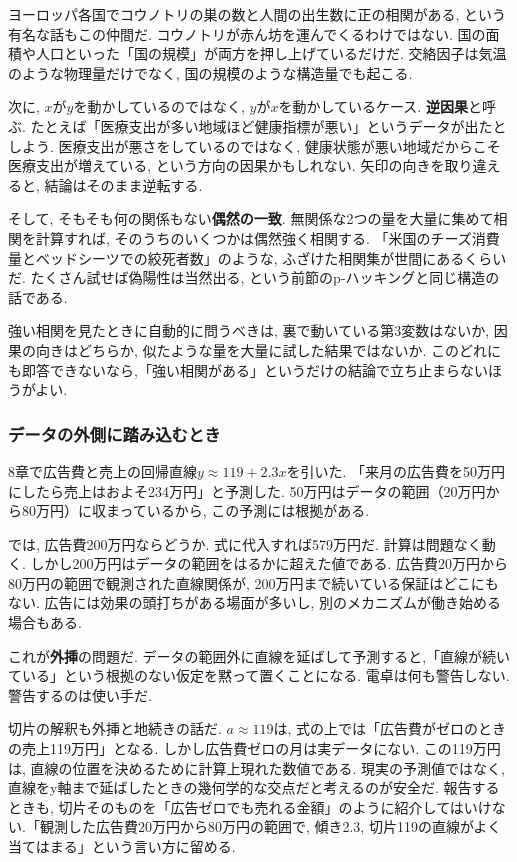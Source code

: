 ヨーロッパ各国でコウノトリの巣の数と人間の出生数に正の相関がある, という有名な話もこの仲間だ.
コウノトリが赤ん坊を運んでくるわけではない. 国の面積や人口といった「国の規模」が両方を押し上げているだけだ.
交絡因子は気温のような物理量だけでなく, 国の規模のような構造量でも起こる.

次に, $x$が$y$を動かしているのではなく, $y$が$x$を動かしているケース. \textbf{逆因果}と呼ぶ.
たとえば「医療支出が多い地域ほど健康指標が悪い」というデータが出たとしよう.
医療支出が悪さをしているのではなく, 健康状態が悪い地域だからこそ医療支出が増えている, という方向の因果かもしれない.
矢印の向きを取り違えると, 結論はそのまま逆転する.

そして, そもそも何の関係もない\textbf{偶然の一致}.
無関係な2つの量を大量に集めて相関を計算すれば, そのうちのいくつかは偶然強く相関する.
「米国のチーズ消費量とベッドシーツでの絞死者数」のような, ふざけた相関集が世間にあるくらいだ.
たくさん試せば偽陽性は当然出る, という前節のp-ハッキングと同じ構造の話である.

強い相関を見たときに自動的に問うべきは, 裏で動いている第3変数はないか, 因果の向きはどちらか, 似たような量を大量に試した結果ではないか.
このどれにも即答できないなら,「強い相関がある」というだけの結論で立ち止まらないほうがよい.

\subsubsection*{データの外側に踏み込むとき}

8章で広告費と売上の回帰直線$y \approx 119 + 2.3x$を引いた.
「来月の広告費を50万円にしたら売上はおよそ234万円」と予測した.
50万円はデータの範囲（20万円から80万円）に収まっているから, この予測には根拠がある.

では, 広告費200万円ならどうか.
式に代入すれば579万円だ. 計算は問題なく動く.
しかし200万円はデータの範囲をはるかに超えた値である.
広告費20万円から80万円の範囲で観測された直線関係が, 200万円まで続いている保証はどこにもない.
広告には効果の頭打ちがある場面が多いし, 別のメカニズムが働き始める場合もある.

これが\textbf{外挿}の問題だ.
データの範囲外に直線を延ばして予測すると,「直線が続いている」という根拠のない仮定を黙って置くことになる.
電卓は何も警告しない. 警告するのは使い手だ.

切片の解釈も外挿と地続きの話だ.
$a \approx 119$は, 式の上では「広告費がゼロのときの売上119万円」となる.
しかし広告費ゼロの月は実データにない.
この119万円は, 直線の位置を決めるために計算上現れた数値である. 現実の予測値ではなく, 直線をy軸まで延ばしたときの幾何学的な交点だと考えるのが安全だ.
報告するときも, 切片そのものを「広告ゼロでも売れる金額」のように紹介してはいけない.「観測した広告費20万円から80万円の範囲で, 傾き2.3, 切片119の直線がよく当てはまる」という言い方に留める.

